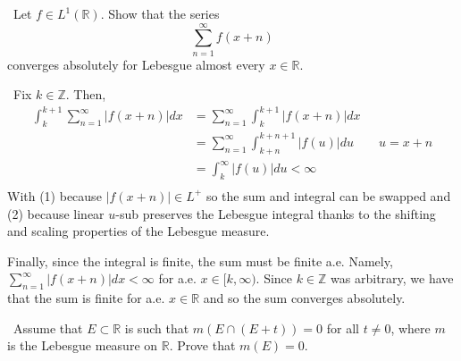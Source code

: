 \documentclass[12pt]{Qual}
\begin{document}
\begin{problem} $\,$
Let $f\in L^1(\mathbb{R})$. Show that the series $$\sum_{n=1}^\infty f(x+n)$$ converges absolutely for Lebesgue almost every $x\in \mathbb{R}.$
\end{problem}


\begin{solution}$\,$
Fix $k\in\mathbb{Z}$. Then,
 \begin{align*}
     \int_k^{k+1}\sum_{n=1}^\infty|f(x+n)|dx&=\sum_{n=1}^\infty\int_k^{k+1}|f(x+n)|dx\tag{1}\\
     &=\sum_{n=1}^\infty\int_{k+n}^{k+n+1}|f(u)|du\qquad u=x+n\tag{2}\\
     &=\int_k^\infty|f(u)|du<\infty\\
 \end{align*}
 With (1) because $|f(x+n)|\in L^+$ so the sum and integral can be swapped and (2) because linear $u$-sub preserves the Lebesgue integral thanks to the shifting and scaling properties of the Lebesgue measure.

 Finally, since the integral is finite, the sum must be finite a.e. Namely, $\displaystyle\sum_{n=1}^\infty|f(x+n)|dx<\infty$ for a.e. $x\in[k,\infty)$. Since $k\in\mathbb{Z}$ was arbitrary, we have that the sum is finite for a.e. $x\in\mathbb{R}$ and so the sum converges absolutely.
\end{solution}
\newpage




\begin{problem} $\,$
Assume that $E\subset\mathbb{R}$ is such that $m(E\cap (E+t))=0$ for all $t\not=0$, where $m$ is the Lebesgue measure on $\mathbb{R}.$ Prove that $m(E)=0.$
\end{problem}
\end{document}
